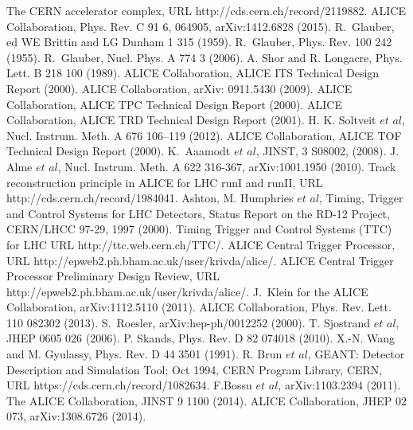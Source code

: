\begin{thebibliography}{4}
 The CERN accelerator complex, URL http://cds.cern.ch/record/2119882.
 ALICE Collaboration, Phys. Rev. C 91 6, 064905, arXiv:1412.6828 (2015).
 R.~Glauber, ed WE Brittin and LG Dunham 1 315 (1959).
 R.~Glauber, Phys. Rev. 100 242 (1955).
 R.~Glauber, Nucl. Phys. A 774 3 (2006).
 A. Shor and R. Longacre, Phys. Lett. B 218 100 (1989).
 ALICE Collaboration, ALICE ITS Technical Design Report (2000).
 ALICE Collaboration, arXiv: 0911.5430 (2009).
 ALICE Collaboration, ALICE TPC Technical Design Report (2000).
 ALICE Collaboration, ALICE TRD Technical Design Report (2001).
 H. K. Soltveit $et$ $al$, Nucl. Instrum. Meth. A 676 106–119 (2012).%
 ALICE Collaboration, ALICE TOF Technical Design Report (2000).
 K.~Aaamodt $et$ $al$,   JINST, 3 S08002, (2008).
 J. Alme $et$ $al$, Nucl. Instrum. Meth. A 622 316-367, arXiv:1001.1950 (2010).
 Track reconstruction principle in ALICE for LHC runI and runII, URL http://cds.cern.ch/record/1984041.
 Ashton, M. Humphries $et$ $al$, Timing, Trigger and Control Systems for LHC Detectors, Status Report on the RD-12 Project, CERN/LHCC 97-29, 1997 (2000).
 Timing Trigger and Control Systems (TTC) for LHC URL http://ttc.web.cern.ch/TTC/.
 ALICE Central Trigger Processor, URL http://epweb2.ph.bham.ac.uk/user/krivda/alice/. 
 ALICE Central Trigger Processor Preliminary Design Review, URL http://epweb2.ph.bham.ac.uk/user/krivda/alice/.
 J.~Klein for the ALICE Collaboration, arXiv:1112.5110 (2011).
 ALICE Collaboration, Phys. Rev. Lett. 110 082302 (2013).
 S.~Roesler, arXiv:hep-ph/0012252 (2000).
T. Sjostrand $et$ $al$,  JHEP 0605 026 (2006).
 P. Skands, Phys. Rev. D 82 074018 (2010).
 X.-N. Wang and M. Gyulassy, Phys. Rev. D 44 3501 (1991).
 R. Brun $et$ $al$, GEANT: Detector Description and Simulation Tool; Oct 1994, CERN Program Library, CERN, URL https://cds.cern.ch/record/1082634.
 F.Bossu $et$ $al$, arXiv:1103.2394 (2011). 
 The ALICE Collaboration, JINST 9 1100 (2014).
 ALICE Collaboration, JHEP 02 073, arXiv:1308.6726 (2014).

\end{thebibliography}
